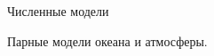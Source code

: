 \begin{chapter}{Численные модели}
\begin{section}{Парные модели океана и атмосферы.}




\end{section}
\end{chapter}
